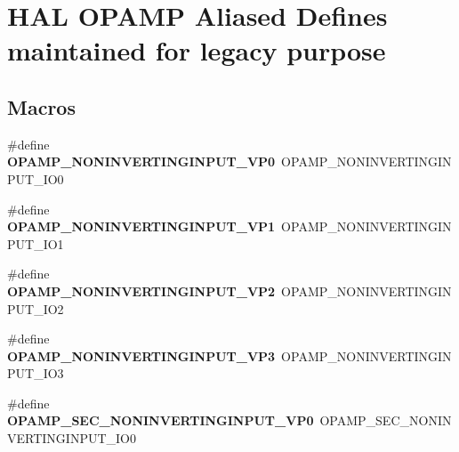 \hypertarget{group___h_a_l___o_p_a_m_p___aliased___defines}{}\section{H\+AL O\+P\+A\+MP Aliased Defines maintained for legacy purpose}
\label{group___h_a_l___o_p_a_m_p___aliased___defines}
\subsection*{Macros}
\begin{DoxyCompactItemize}
\item 
\#define {\bfseries O\+P\+A\+M\+P\+\_\+\+N\+O\+N\+I\+N\+V\+E\+R\+T\+I\+N\+G\+I\+N\+P\+U\+T\+\_\+\+V\+P0}~O\+P\+A\+M\+P\+\_\+\+N\+O\+N\+I\+N\+V\+E\+R\+T\+I\+N\+G\+I\+N\+P\+U\+T\+\_\+\+I\+O0\hypertarget{group___h_a_l___o_p_a_m_p___aliased___defines_ga0c8a66d4ef4f3e5ddff93741d59730a9}{}\label{group___h_a_l___o_p_a_m_p___aliased___defines_ga0c8a66d4ef4f3e5ddff93741d59730a9}

\item 
\#define {\bfseries O\+P\+A\+M\+P\+\_\+\+N\+O\+N\+I\+N\+V\+E\+R\+T\+I\+N\+G\+I\+N\+P\+U\+T\+\_\+\+V\+P1}~O\+P\+A\+M\+P\+\_\+\+N\+O\+N\+I\+N\+V\+E\+R\+T\+I\+N\+G\+I\+N\+P\+U\+T\+\_\+\+I\+O1\hypertarget{group___h_a_l___o_p_a_m_p___aliased___defines_ga2373d73432511331d18e850f2cbcb637}{}\label{group___h_a_l___o_p_a_m_p___aliased___defines_ga2373d73432511331d18e850f2cbcb637}

\item 
\#define {\bfseries O\+P\+A\+M\+P\+\_\+\+N\+O\+N\+I\+N\+V\+E\+R\+T\+I\+N\+G\+I\+N\+P\+U\+T\+\_\+\+V\+P2}~O\+P\+A\+M\+P\+\_\+\+N\+O\+N\+I\+N\+V\+E\+R\+T\+I\+N\+G\+I\+N\+P\+U\+T\+\_\+\+I\+O2\hypertarget{group___h_a_l___o_p_a_m_p___aliased___defines_gaefe0c48289b99fc2a72078562ab1bbce}{}\label{group___h_a_l___o_p_a_m_p___aliased___defines_gaefe0c48289b99fc2a72078562ab1bbce}

\item 
\#define {\bfseries O\+P\+A\+M\+P\+\_\+\+N\+O\+N\+I\+N\+V\+E\+R\+T\+I\+N\+G\+I\+N\+P\+U\+T\+\_\+\+V\+P3}~O\+P\+A\+M\+P\+\_\+\+N\+O\+N\+I\+N\+V\+E\+R\+T\+I\+N\+G\+I\+N\+P\+U\+T\+\_\+\+I\+O3\hypertarget{group___h_a_l___o_p_a_m_p___aliased___defines_ga45a66909e6190a2cef2b6cb1a623ef3e}{}\label{group___h_a_l___o_p_a_m_p___aliased___defines_ga45a66909e6190a2cef2b6cb1a623ef3e}

\item 
\#define {\bfseries O\+P\+A\+M\+P\+\_\+\+S\+E\+C\+\_\+\+N\+O\+N\+I\+N\+V\+E\+R\+T\+I\+N\+G\+I\+N\+P\+U\+T\+\_\+\+V\+P0}~O\+P\+A\+M\+P\+\_\+\+S\+E\+C\+\_\+\+N\+O\+N\+I\+N\+V\+E\+R\+T\+I\+N\+G\+I\+N\+P\+U\+T\+\_\+\+I\+O0\hypertarget{group___h_a_l___o_p_a_m_p___aliased___defines_ga0ca7da83e2be923743de9b1fa58e0b01}{}\label{group___h_a_l___o_p_a_m_p___aliased___defines_ga0ca7da83e2be923743de9b1fa58e0b01}


\end{DoxyCompactItemize}
